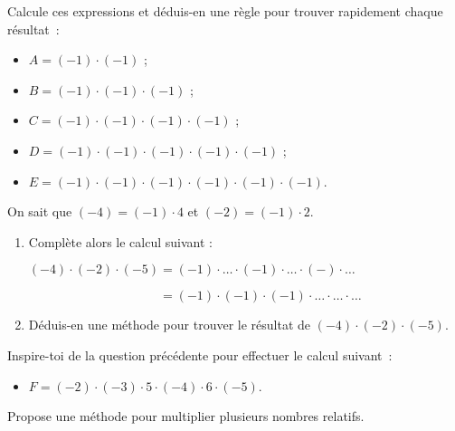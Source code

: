 
\begin{activite}

\begin{partie}
Calcule ces expressions et déduis-en une règle pour trouver rapidement chaque résultat :
\begin{itemize}
 \item $A = (-1) \cdot (-1)$ ;
 \item $B = (-1) \cdot (-1) \cdot (-1)$ ;
 \item $C = (-1) \cdot (-1) \cdot (-1) \cdot (-1)$ ;
 \item $D = (-1) \cdot (-1) \cdot (-1) \cdot (-1) \cdot (-1)$ ;
 \item $E = (-1) \cdot (-1) \cdot (-1) \cdot (-1) \cdot (-1) \cdot (-1)$.
 \end{itemize}
\end{partie}

\begin{partie}
On sait que $(-4) = (-1) \cdot 4$ et $(-2) = (-1) \cdot 2$.
\begin{enumerate}
 \item Complète alors le calcul suivant :
\begin{center} $(-4) \cdot (-2) \cdot (-5) = (-1) \cdot \ldots \cdot (-1) \cdot \ldots \cdot (- ) \cdot \ldots$ \end{center}
\begin{center} $\phantom{(-4) \cdot (-2) \cdot (-5) }= (-1) \cdot (-1) \cdot (-1) \cdot \ldots \cdot \ldots \cdot \ldots$ \end{center}
 \item Déduis-en une méthode pour trouver le résultat de $(-4) \cdot (-2) \cdot (-5)$.
 \end{enumerate}
\end{partie}

\begin{partie}
Inspire-toi de la question précédente pour effectuer le calcul suivant :
\begin{itemize}
 \item $F = (-2) \cdot (-3) \cdot 5 \cdot (-4) \cdot 6 \cdot (-5)$.
 \end{itemize}
\end{partie}

\begin{partie}
Propose une méthode pour multiplier plusieurs nombres relatifs.
\end{partie}

\end{activite}

